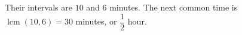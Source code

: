Their intervals are $10$ and $6$ minutes. The next common time is $\operatorname{lcm}(10,6)=30$ minutes, or $\boxed{\dfrac{1}{2}}$ hour.
